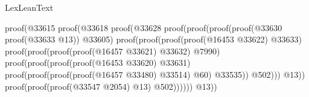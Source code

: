 \begin{lexlean}{LexLeanText}
\begin{coremodule}
                                                        proof(@33615
                                                            proof(@33618
                                                                proof(@33628
                                                                    proof(proof(proof(proof(@33630
                                                                              proof(@33633 @13))
                                                                            @33605)
                                                                          proof(proof(proof(proof(@16453
                                                                                    @33622)
                                                                                  @33633)
                                                                                proof(proof(proof(proof(@16457
                                                                                          @33621)
                                                                                        @33632)
                                                                                      @7990)
                                                                                    proof(proof(proof(proof(@16453
                                                                                              @33620)
                                                                                            @33631)
                                                                                          proof(proof(proof(proof(@16457
                                                                                                    @33480)
                                                                                                  @33514)
                                                                                                @60)
                                                                                              @33535))
                                                                                        @502)))
                                                                              @13))
                                                                        proof(proof(proof(@33547
                                                                                @2054)
                                                                              @13)
                                                                            @502))))))
                                                      @13))

\end{coremodule}
\end{lexlean}
